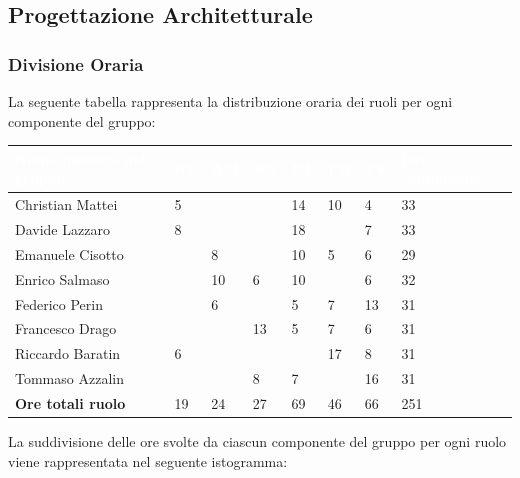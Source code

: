 \subsection{Progettazione Architetturale}

\subsubsection{Divisione Oraria}
La seguente tabella rappresenta la distribuzione oraria dei ruoli per ogni componente del gruppo:
{
\renewcommand{\arraystretch}{2}
\begin{table}[h]
\caption{Tabella della divisione oraria della Progettazione Architetturale}
\begin{longtable}{ C{5cm} C{1cm} C{1cm} C{1cm} C{1cm} C{1cm} C{1cm} C{3cm}}
	\textcolor{white}{\textbf{Nome membro del gruppo}} & 
	\textcolor{white}{\textbf{RE}} & 
	\textcolor{white}{\textbf{AM}} & 
	\textcolor{white}{\textbf{AN}} & 
	\textcolor{white}{\textbf{PT}} & 
	\textcolor{white}{\textbf{PR}} & 
	\textcolor{white}{\textbf{VE}} & 
	\textcolor{white}{\textbf{Ore complessive}}\\	
	\endhead
        
    Christian Mattei & 5 & & & 14 & 10 & 4 & 33\\
    Davide Lazzaro & 8 & & & 18 & & 7 & 33 \\
    Emanuele Cisotto & & 8 & & 10 & 5 & 6 & 29 \\
    Enrico Salmaso & & 10 & 6 & 10 & & 6 & 32 \\
    Federico Perin & & 6 & & 5 & 7 & 13 &  31\\
    Francesco Drago & & & 13 & 5 & 7 & 6 & 31 \\
    Riccardo Baratin & 6 & & & & 17 & 8 & 31\\
    Tommaso Azzalin & & & 8 & 7 & & 16 & 31\\
	\textbf{Ore totali ruolo} & 19 & 24 & 27 & 69 & 46 & 66 & 251\\
		
	\end{longtable}
\end{table}
}

La suddivisione delle ore svolte da ciascun componente del gruppo per ogni ruolo viene rappresentata nel seguente istogramma:

